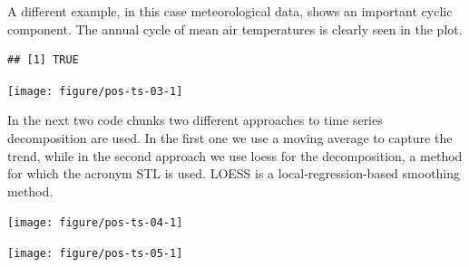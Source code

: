 \documentclass[krantz2]{krantz}\usepackage{knitr}%
\begin{document}
A different example, in this case meteorological data, shows an important cyclic component. The annual cycle of mean air temperatures is clearly seen in the plot.
\begin{knitrout}\footnotesize
{}\color{fgcolor}\begin{kframe}
\begin{alltt}
\end{alltt}
\begin{verbatim}
## [1] TRUE
\end{verbatim}
\begin{alltt}
\end{alltt}
\end{kframe}

{\centering \texttt{[image: figure/pos-ts-03-1]} 

}



\end{knitrout}

In the next two code chunks two different approaches to time series decomposition are used. In the first one we use a moving average to capture the trend, while in the second approach we use loess for the decomposition, a method for which the acronym STL is used. LOESS is a local-regression-based smoothing method.
\begin{knitrout}\footnotesize
{}\color{fgcolor}\begin{kframe}
\begin{alltt}
 \hlkwb{<-}  \hlopt{-} \hlstd{)} \hlopt{*} \hlopt{/}
\hlstd{(}
\end{alltt}
\end{kframe}

{\centering \texttt{[image: figure/pos-ts-04-1]} 

}



\end{knitrout}

\begin{knitrout}\footnotesize
{}\color{fgcolor}\begin{kframe}
\begin{alltt}
\hlstd{(}  \hlstd{=} \hlstd{))}
\end{alltt}
\end{kframe}

{\centering \texttt{[image: figure/pos-ts-05-1]} 

}



\end{knitrout}
\end{document}
